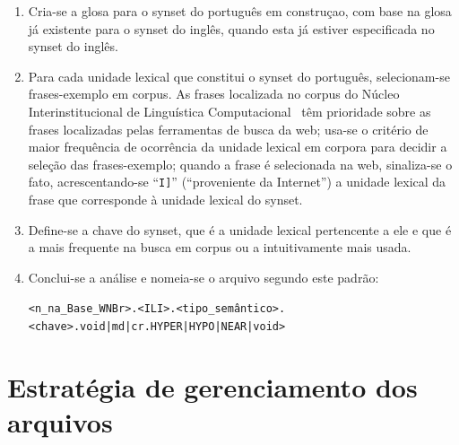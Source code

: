 \begin{enumerate}
  \item Cria-se a glosa para o synset do português em construçao, com base na
    glosa já existente para o synset do inglês, quando esta já estiver
    especificada no synset do inglês.

  \item Para cada unidade lexical que constitui o synset do português,
    selecionam-se frases-exemplo em corpus. As frases localizada no corpus do
    Núcleo Interinstitucional de Linguística Computacional~\cite{nilc} têm
    prioridade sobre as frases localizadas pelas ferramentas de busca da web;
    usa-se o critério de maior frequência de ocorrência da unidade lexical em
    corpora para decidir a seleção das frases-exemplo; quando a frase é selecionada
  na web, sinaliza-se o fato, acrescentando-se ``\texttt{I]}'' (``proveniente da
  Internet'') a unidade lexical da frase que corresponde à unidade lexical do
  synset.

\item Define-se a chave do synset, que é a unidade lexical pertencente a ele e
  que é a mais frequente na busca em corpus ou a intuitivamente mais usada.

\item Conclui-se a análise e nomeia-se o arquivo segundo este padrão:

  \begin{center}
    \texttt{<n\textordmasculine\_na\_Base\_WNBr>.<ILI>.<tipo\_semântico>.
    <chave>.void|md|cr.HYPER|HYPO|NEAR|void>}
  \end{center}

\end{enumerate}

\section{Estratégia de gerenciamento dos arquivos}

% 


